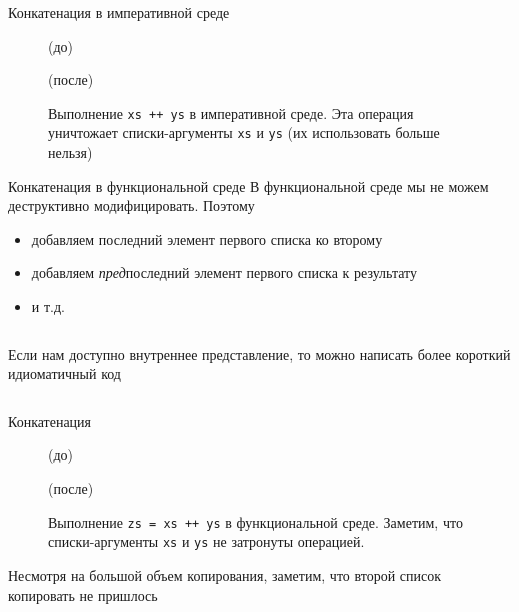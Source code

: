 \begin{frame}[fragile]{Конкатенация в императивной среде}
\begin{figure}[h]
	\par
	(до)\par
	\par
	(после)\par
	\caption{Выполнение \texttt{xs ++ ys} в императивной среде. Эта операция уничтожает списки-аргументы \texttt{xs} и \texttt{ys} (их использовать больше нельзя)}
	\label{fig:2.4}
\end{figure}
\end{frame}


\begin{frame}[fragile]{Конкатенация в функциональной среде}
В функциональной среде мы не можем деструктивно модифицировать. Поэтому
\begin{itemize}
\item добавляем последний элемент первого списка ко второму
\item добавляем \emph{пред}последний элемент первого списка к результату
\item и т.д.
\end{itemize}

\inputminted[firstline=50,lastline=54] {haskell}{code/Stacks.hs}
Если нам доступно внутреннее представление, то можно написать более короткий идиоматичный код
\inputminted[firstline=57,lastline=58,gobble=2] {haskell}{code/Stacks.hs}
\end{frame}


\begin{frame}[fragile]{Конкатенация}
\begin{figure}[h]
	\centering
	\par
	(до)\par
	\vspace{0.5cm}
	\par
	(после)\par
	\vspace{0.5cm}
	\caption{Выполнение \texttt{zs = xs ++ ys} в функциональной среде. Заметим, что списки-аргументы \texttt{xs} и \texttt{ys} не затронуты операцией.
	}
	\label{fig:2.5}
\end{figure}
Несмотря на большой объем копирования, заметим, что второй список копировать не пришлось
\end{frame}

